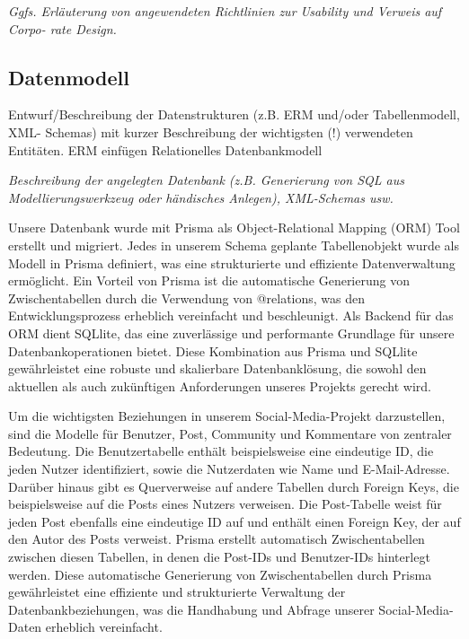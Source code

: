 \documentclass[a4paper,12pt]{article}
\begin{document}
\textit{
Ggfs. Erläuterung von angewendeten Richtlinien zur Usability und Verweis auf
Corpo- rate Design.}

\subsection{Datenmodell}
Entwurf/Beschreibung der Datenstrukturen (z.B. ERM
und/oder Tabellenmodell, XML- Schemas) mit kurzer Beschreibung der wichtigsten
(!) verwendeten Entitäten. ERM einfügen 
Relationelles Datenbankmodell 

\textit{Beschreibung der angelegten Datenbank (z.B. Generierung von SQL aus Modellierungswerkzeug oder händisches Anlegen), XML-Schemas usw.}

Unsere Datenbank wurde mit Prisma als Object-Relational Mapping (ORM) Tool erstellt und migriert. Jedes in unserem Schema geplante Tabellenobjekt wurde als Modell in Prisma definiert, was eine strukturierte und effiziente Datenverwaltung ermöglicht. Ein Vorteil von Prisma ist die automatische Generierung von Zwischentabellen durch die Verwendung von @relations, was den Entwicklungsprozess erheblich vereinfacht und beschleunigt. Als Backend für das ORM dient SQLlite, das eine zuverlässige und performante Grundlage für unsere Datenbankoperationen bietet. Diese Kombination aus Prisma und SQLlite gewährleistet eine robuste und skalierbare Datenbanklösung, die sowohl den aktuellen als auch zukünftigen Anforderungen unseres Projekts gerecht wird.

Um die wichtigsten Beziehungen in unserem Social-Media-Projekt darzustellen, sind die Modelle für Benutzer, Post, Community und Kommentare von zentraler Bedeutung. Die Benutzertabelle enthält beispielsweise eine eindeutige ID, die jeden Nutzer identifiziert, sowie die Nutzerdaten wie Name und E-Mail-Adresse. Darüber hinaus gibt es Querverweise auf andere Tabellen durch Foreign Keys, die beispielsweise auf die Posts eines Nutzers verweisen. Die Post-Tabelle weist für jeden Post ebenfalls eine eindeutige ID auf und enthält einen Foreign Key, der auf den Autor des Posts verweist. Prisma erstellt automatisch Zwischentabellen zwischen diesen Tabellen, in denen die Post-IDs und Benutzer-IDs hinterlegt werden. Diese automatische Generierung von Zwischentabellen durch Prisma gewährleistet eine effiziente und strukturierte Verwaltung der Datenbankbeziehungen, was die Handhabung und Abfrage unserer Social-Media-Daten erheblich vereinfacht. 
\end{document}
